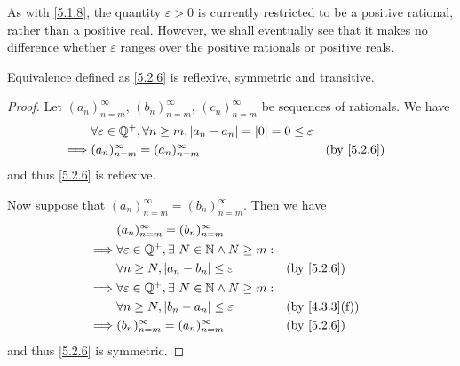 \begin{rmk}\label{5.2.7}
  As with \cref{5.1.8}, the quantity \(\varepsilon > 0\) is currently restricted to be a positive rational, rather than a positive real.
  However, we shall eventually see that it makes no difference whether \(\varepsilon\) ranges over the positive rationals or positive reals.
\end{rmk}

\begin{ac}\label{ac:5.2.1}
  Equivalence defined as \cref{5.2.6} is reflexive, symmetric and transitive.
\end{ac}

\begin{proof}
  Let \((a_n)_{n = m}^\infty\), \((b_n)_{n = m}^\infty\), \((c_n)_{n = m}^\infty\) be sequences of rationals.
  We have
  \begin{align*}
             & \forall \varepsilon \in \Q^+, \forall n \geq m, \abs{a_n - a_n} = \abs{0} = 0 \leq \varepsilon                               \\
    \implies & (a_n)_{n = m}^\infty = (a_n)_{n = m}^\infty                                                    &  & \text{(by \cref{5.2.6})}
  \end{align*}
  and thus \cref{5.2.6} is reflexive.

  Now suppose that \((a_n)_{n = m}^\infty = (b_n)_{n = m}^\infty\).
  Then we have
  \begin{align*}
             & (a_n)_{n = m}^\infty = (b_n)_{n = m}^\infty                                                      \\
    \implies & \forall \varepsilon \in \Q^+, \exists\ N \in \N \land N \geq m:                                  \\
             & \forall n \geq N, \abs{a_n - b_n} \leq \varepsilon              &  & \text{(by \cref{5.2.6})}    \\
    \implies & \forall \varepsilon \in \Q^+, \exists\ N \in \N \land N \geq m:                                  \\
             & \forall n \geq N, \abs{b_n - a_n} \leq \varepsilon              &  & \text{(by \cref{4.3.3}(f))} \\
    \implies & (b_n)_{n = m}^\infty = (a_n)_{n = m}^\infty                     &  & \text{(by \cref{5.2.6})}
  \end{align*}
  and thus \cref{5.2.6} is symmetric.


\end{proof}
